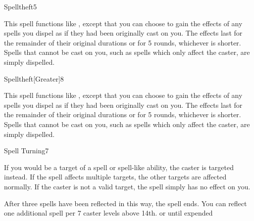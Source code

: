 \begin{spellsection}{Spelltheft}{5}
\begin{spellheader}
\end{spellheader}
\begin{spellcontent}
    \spellspecial This spell functions like , except that you can choose to gain the effects of any spells you dispel as if they had been originally cast on you. The effects last for the remainder of their original durations or for 5 rounds, whichever is shorter. Spells that cannot be cast on you, such as spells which only affect the caster, are simply dispelled.
\end{spellcontent}
\begin{spellfooter}
\end{spellfooter}
\end{spellsection}

\begin{spellsection}{Spelltheft}[Greater]{8}
\begin{spellheader}
\end{spellheader}
\begin{spellcontent}
    \spellspecial This spell functions like , except that you can choose to gain the effects of any spells you dispel as if they had been originally cast on you. The effects last for the remainder of their original durations or for 5 rounds, whichever is shorter. Spells that cannot be cast on you, such as spells which only affect the caster, are simply dispelled.
\end{spellcontent}
\begin{spellfooter}
\end{spellfooter}
\end{spellsection}

\begin{spellsection}{Spell Turning}{7}
\begin{spellheader}
    \begin{spelltargetinginfo}
    \end{spelltargetinginfo}
\end{spellheader}
\begin{spellcontent}
    \begin{spelleffects}
        \spelleffect If you would be a target of a spell or spell-like ability, the caster is targeted instead. If the spell affects multiple targets, the other targets are affected normally. If the caster is not a valid target, the spell simply has no effect on you.

        After three spells have been reflected in this way, the spell ends. You can reflect one additional spell per 7 caster levels above 14th.
        \spelldur \durlong or until expended
    \end{spelleffects}
\end{spellcontent}
\begin{spellfooter}
\end{spellfooter}
\end{spellsection}

